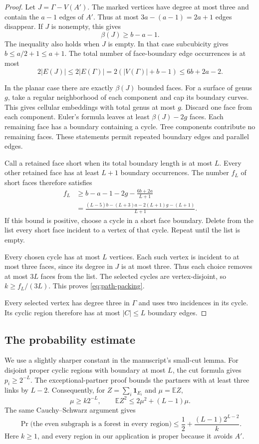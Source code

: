 \begin{proof}
Let $J=\Gamma-V(A')$.
The marked vertices have degree at most three and contain the $a-1$ edges of $A'$.
Thus at most $3a-(a-1)=2a+1$ edges disappear.
If $J$ is nonempty, this gives
\[
 \beta(J)\ge b-a-1.
\]
The inequality also holds when $J$ is empty.
In that case subcubicity gives $b\le a/2+1\le a+1$.
The total number of face-boundary edge occurrences is at most
\[
 2|E(J)|\le2|E(\Gamma)|
 =2(|V(\Gamma)|+b-1)\le6b+2a-2.
\]

In the planar case there are exactly $\beta(J)$ bounded faces.
For a surface of genus $g$, take a regular neighborhood of each component and cap its boundary curves.
This gives cellular embeddings with total genus at most $g$.
Discard one face from each component.
Euler's formula leaves at least $\beta(J)-2g$ faces.
Each remaining face has a boundary containing a cycle.
Tree components contribute no remaining faces.
These statements permit repeated boundary edges and parallel edges.

Call a retained face short when its total boundary length is at most $L$.
Every other retained face has at least $L+1$ boundary occurrences.
The number $f_L$ of short faces therefore satisfies
\[
 \begin{split}
 f_L&\ge b-a-1-2g-\frac{6b+2a}{L+1}\\
 &=\frac{(L-5)b-(L+3)a-2(L+1)g-(L+1)}{L+1}.
 \end{split}
\]
If this bound is positive, choose a cycle in a short face boundary.
Delete from the list every short face incident to a vertex of that cycle.
Repeat until the list is empty.

Every chosen cycle has at most $L$ vertices.
Each such vertex is incident to at most three faces, since its degree in $J$ is at most three.
Thus each choice removes at most $3L$ faces from the list.
The selected cycles are vertex-disjoint, so $k\ge f_L/(3L)$.
This proves \eqref{eq:path-packing}.

Every selected vertex has degree three in $\Gamma$ and uses two incidences in its cycle.
Its cyclic region therefore has at most $|C|\le L$ boundary edges.
\end{proof}

\subsection{The probability estimate}

We use a slightly sharper constant in the manuscript's small-cut lemma.
For disjoint proper cyclic regions with boundary at most $L$, the cut formula gives $p_i\ge2^{-L}$.
The exceptional-partner proof bounds the partners with at least three links by $L-2$.
Consequently, for $Z=\sum_i\mathbf1_{E_i}$ and $\mu=\mathbb EZ$,
\[
 \mu\ge k2^{-L},\qquad
 \mathbb EZ^2\le2\mu^2+(L-1)\mu.
\]
The same Cauchy--Schwarz argument gives
\begin{equation}\label{eq:path-small-cuts}
 \Pr\bigl(\text{the even subgraph is a forest in every region}\bigr)
 \le\frac12+\frac{(L-1)2^{L-2}}{k}.
\end{equation}
Here $k\ge1$, and every region in our application is proper because it avoids $A'$.


